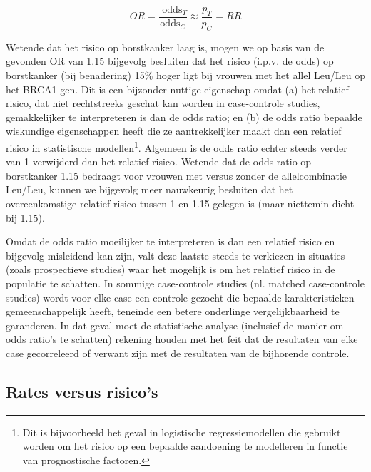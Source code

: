 \documentclass[
  12pt,dutch]{book}
\theoremstyle{definition}
\theoremstyle{definition}
\theoremstyle{definition}
\theoremstyle{definition}
\theoremstyle{remark}
\begin{document}
\begin{equation*}
OR=\frac{\mbox{ odds}_T}{\mbox{
odds}_C}\approx \frac{p_T}{p_C}=RR
\end{equation*}

Wetende dat het risico op borstkanker laag is, mogen we
op basis van de gevonden OR van 1.15 bijgevolg
besluiten dat het risico (i.p.v. de odds) op borstkanker (bij benadering) 15\% hoger ligt bij vrouwen met het allel Leu/Leu op het BRCA1 gen. Dit is een bijzonder
nuttige eigenschap omdat (a) het relatief risico, dat niet rechtstreeks
geschat kan worden in case-controle studies, gemakkelijker te interpreteren
is dan de odds ratio; en (b) de odds ratio bepaalde wiskundige eigenschappen
heeft die ze aantrekkelijker maakt dan een relatief risico in statistische
modellen\footnote{Dit is bijvoorbeeld het geval in logistische regressiemodellen die gebruikt worden om het
  risico op een bepaalde aandoening te modelleren in functie van prognostische
  factoren.}. Algemeen is de odds ratio echter steeds verder van 1 verwijderd
dan het relatief risico. Wetende dat de odds ratio op borstkanker 1.15
bedraagt voor vrouwen met versus zonder de allelcombinatie Leu/Leu, kunnen we bijgevolg meer
nauwkeurig besluiten dat het overeenkomstige relatief risico tussen 1 en 1.15
gelegen is (maar niettemin dicht bij 1.15).

Omdat de odds ratio moeilijker te interpreteren is dan een relatief risico
en bijgevolg misleidend kan zijn, valt deze laatste steeds te verkiezen in
situaties (zoals prospectieve studies) waar het mogelijk is om het relatief
risico in de populatie te schatten. In sommige case-controle studies (nl.
matched case-controle studies) wordt voor elke case een controle gezocht die
bepaalde karakteristieken gemeenschappelijk heeft, teneinde een betere
onderlinge vergelijkbaarheid te garanderen. In dat geval moet de
statistische analyse (inclusief de manier om odds ratio's te schatten)
rekening houden met het feit dat de resultaten van elke case gecorreleerd of
verwant zijn met de resultaten van de bijhorende controle.

\subsection{Rates versus risico's}\label{rates-versus-risicos}
\end{document}

